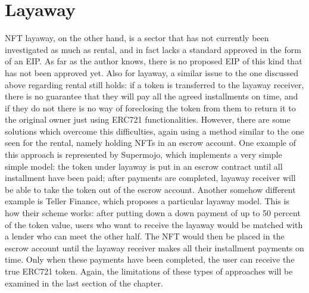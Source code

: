 \documentclass[english, LaM, oneside]{sapthesis}%
\begin{document}
\section{Layaway}
NFT layaway, on the other hand, is a sector that has not currently been investigated as much as rental, and in fact lacks a standard approved in the form of an EIP. As far as the author knows, there is no proposed EIP of this kind that has not been approved yet.\newline
Also for layaway, a similar issue to the one discussed above regarding rental still holds: if a token is transferred to the layaway receiver, there is no guarantee that they will pay all the agreed installments on time, and if they do not there is no way of foreclosing the token from them to return it to the original owner just using ERC721 functionalities.\newline
However, there are some solutions which overcome this difficulties, again using a method similar to the one seen for the rental, namely holding NFTs in an escrow account.\newline 
One example of this approach is represented by Supermojo\cite{ref:supermojo}, which implements a very simple simple model: the token under layaway is put in an escrow contract until all installment have been paid; after payments are completed, layaway receiver will be able to take the token out of the escrow account.\newline
Another somehow different example is Teller Finance\cite{ref:teller}, which proposes a  particular layaway model. This is how their scheme works: after putting down a down payment of up to 50 percent of the token value, users who want to receive the layaway would be matched with a lender who can meet the other half.
The NFT would then be placed in the escrow account until the layaway receiver makes all their installment payments on time. Only when these payments have been completed, the user can receive the true ERC721 token.\newline
Again, the limitations of these types of approaches will be examined in the last section of the chapter.
\end{document}
